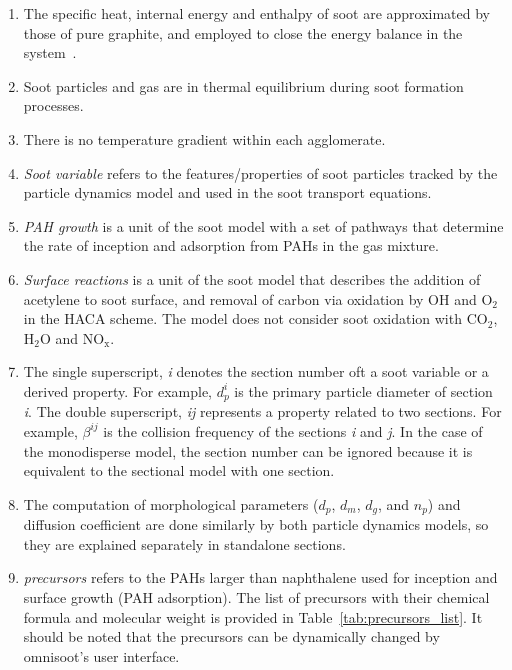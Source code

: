 \begin{enumerate}
\item The specific heat, internal energy and enthalpy of soot are approximated by those of pure graphite, and employed to close the energy balance in the system~\cite{mcbride1993coefficients}.

\item Soot particles and gas are in thermal equilibrium during soot formation processes.

\item There is no temperature gradient within each agglomerate.

\item \textit{Soot variable} refers to the features/properties of soot particles tracked by the particle dynamics model and used in the soot transport equations.

\item \textit{PAH growth} is a unit of the soot model with a set of pathways that determine the rate of inception and adsorption from PAHs in the gas mixture.

\item \textit{Surface reactions} is a unit of the soot model that describes the addition of acetylene to soot surface, and removal of carbon via oxidation by OH and $\mathrm{O_2}$ in the HACA scheme. The model does not consider soot oxidation with $\mathrm{CO_2}$, $\mathrm{H_2O}$ and $\mathrm{NO_x}$.

\item The single superscript, \textit{i} denotes the section number oft a soot variable or a derived property. For example, $d^i_p$ is the primary particle diameter of section \textit{i}. The double superscript, \textit{ij} represents a property related to two sections. For example, $\beta^{ij}$ is the collision frequency of the sections \textit{i} and \textit{j}.  In the case of the monodisperse model, the section number can be ignored because it is equivalent to the sectional model with one section.

\item The computation of morphological parameters ($d_p$, $d_m$, $d_g$, and $n_p$) and diffusion coefficient are done similarly by both particle dynamics models, so they are explained separately in standalone sections.

\item \textit{precursors} refers to the PAHs larger than naphthalene used for inception and surface growth (PAH adsorption). The list of precursors with their chemical formula and molecular weight is provided in Table~\ref{tab:precursors_list}. It should be noted that the precursors can be dynamically changed by omnisoot's user interface.


\end{enumerate}
